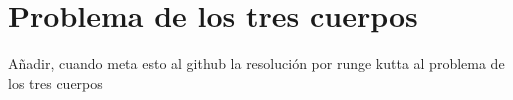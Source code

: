 \documentclass[../main.tex]{subfiles}
\begin{document}
\section{Problema de los tres cuerpos}
Añadir, cuando meta esto al github la resolución por runge kutta al problema de los tres cuerpos
 
\end{document}
